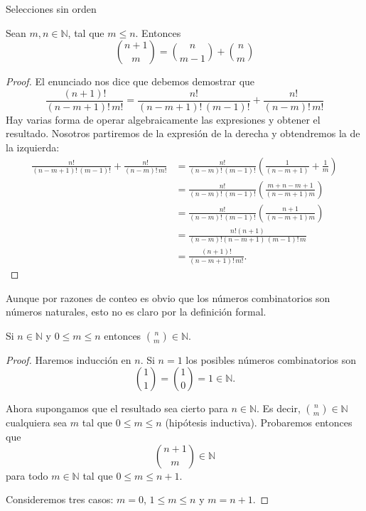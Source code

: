 \begin{section}{Selecciones sin orden}

\begin{teorema} \label{propcomb}
Sean $m,n \in \mathbb N$, tal que $m \le n$. Entonces
$$
\binom{n+1}{m} = \binom{n}{m-1} + \binom{n}{m}  
$$
\end{teorema}
\begin{proof}
El enunciado nos dice que debemos demostrar que 
\begin{equation*}
\frac{(n+1)!}{(n-m+1)!\,m!} = \frac{n!}{(n-m+1)!\,(m-1)!} +  \frac{n!}{(n-m)!\,m!}
\end{equation*}
Hay varias forma de operar algebraicamente las expresiones y obtener el resultado. Nosotros partiremos de la expresión de la derecha y obtendremos la de la izquierda:
\begin{align*}
\frac{n!}{(n-m+1)!\,(m-1)!} +  \frac{n!}{(n-m)!\,m!} &= \frac{n!}{(n-m)!\,(m-1)!}\left(\frac{1}{(n-m+1)} +  \frac{1}{m}\right)\\
&= \frac{n!}{(n-m)!\,(m-1)!}\left(\frac{m+n-m+1}{(n-m+1)m} \right) \\
& = \frac{n!}{(n-m)!\,(m-1)!}\left(\frac{n+1}{(n-m+1)m} \right) \\
& = \frac{n!(n+1)}{(n-m)!(n-m+1)\,(m-1)!\,m}\\
& = \frac{(n+1)!}{(n-m+1)!\,m!}.
\end{align*}

\end{proof}


Aunque por razones de conteo es obvio que los números combinatorios son números naturales, esto no es claro por la definición formal.  
\begin{corolario}
Si $n \in \mathbb N$ y $ 0\le m \le n$ entonces $\displaystyle\binom{n}{m} \in \mathbb N$.
\end{corolario}
\begin{proof}
Haremos inducción en $n$. Si $n = 1$ los posibles números
combinatorios son
$$
\binom{1}{1}  = \binom{1}{0}  = 1 \in \mathbb N.
$$

Ahora supongamos que el resultado sea cierto  para $n \in \mathbb N$. Es decir, $\binom{n}{m} \in \mathbb N$ cualquiera sea $m$ tal que $0 \le m \le n$ (hipótesis inductiva). Probaremos entonces que 
\begin{equation*}
	\binom{n+1}{m} \in \mathbb N
\end{equation*}
 para todo  $m \in \mathbb{N}$ tal que $0 \le m \le n+1$. 
 
Consideremos tres casos: $m=0$,\; $1 \le m \le n$\; y \;$m = n+1$.


\end{proof}
\end{section}
